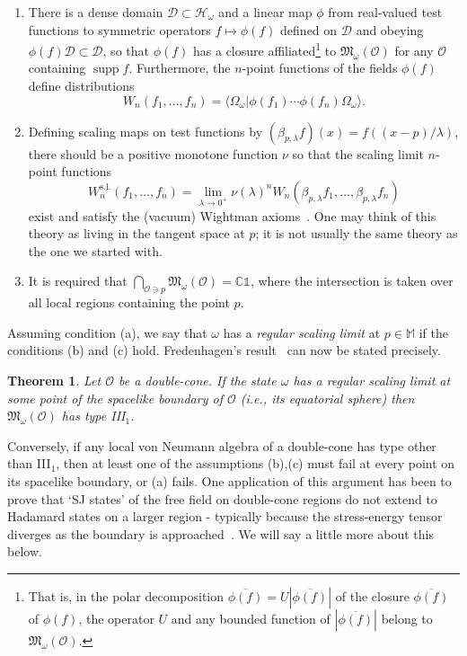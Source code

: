 \documentclass[12pt,a4paper]{article}
\newcommand{\1}{\mathds{1}}                         %
\newcommand{\CC}{\mathbb{C}}           %
\newcommand{\Ocal}{\mathcal{O}}
\newcommand{\MM}{\mathbb{M}}
\newcommand{\HH}{{\mathcal{H}}}
\newcommand{\DD}{{\mathscr{D}}}
\newcommand{\Mf}{{\mathfrak{M}}}
\newcommand{\II}{{\mathbb{1}}}
\newcommand{\ip}[2]{\langle #1|#2\rangle}
\newtheorem{theorem}{Theorem}%
\DeclareMathOperator{\supp}{supp}
\begin{document}
\begin{enumerate}[label=(\alph*)]
	\item There is a dense domain $\DD\subset \HH_\omega$ and a linear map $\phi$
	from real-valued test functions to symmetric operators $f\mapsto\phi(f)$ defined on $\DD$ and obeying $\phi(f)\DD\subset\DD$, so that $\phi(f)$ has a closure affiliated\footnote{That is, in the polar decomposition $\overline{\phi(f)}=U|\overline{\phi(f)}|$ of the closure $\overline{\phi(f)}$ of $\phi(f)$, the operator $U$ and any bounded function of $|\overline{\phi(f)}|$ belong to $\Mf_\omega(\Ocal)$.} 
	to $\Mf_\omega(\Ocal)$ for any $\Ocal$ containing $\supp f$. Furthermore, the $n$-point functions of the fields $\phi(f)$ define distributions
	\[
	W_n(f_1,\ldots,f_n)= \ip{\Omega_\omega}{\phi(f_1)\cdots\phi(f_n)\Omega_\omega}.
	\]
	\item Defining scaling maps on test functions by $(\beta_{p,\lambda}f)(x)=f((x-p)/\lambda)$, there should be a positive monotone function $\nu$ so that the scaling limit $n$-point functions
	\[
	W_n^{\text{s.l.}}(f_1,\ldots,f_n) = \lim_{\lambda\to 0^+} \nu(\lambda)^n W_n(\beta_{p,\lambda}f_1,\ldots,\beta_{p,\lambda} f_n)
	\] 
	exist and
	satisfy the (vacuum) Wightman axioms~\cite{StreaterWightman}. One may think of this theory as living in the tangent space at $p$; it is not usually the same theory as the one we started with.
	\item It is required that $\bigcap_{\Ocal\owns p}\Mf_\omega(\Ocal)=\CC\II$, where the intersection is taken over all local regions containing the point $p$.
\end{enumerate}
Assuming condition (a), we say that $\omega$ has a \emph{regular scaling limit} at $p\in\MM$ if the conditions (b) and (c) hold. Fredenhagen's result~\cite{Fredenhagen:1985} can now be stated precisely.
\begin{theorem}\label{thm:universaltype}
	Let $\Ocal$ be a double-cone. If the state $\omega$ has a regular scaling limit at some point of the spacelike boundary of $\Ocal$ (i.e., its equatorial sphere) then $\Mf_\omega(\Ocal)$ has type III${}_1$.   
\end{theorem} 
Conversely, if any local von Neumann algebra of a double-cone has type other than III${}_1$, then at least one of the assumptions (b),(c) must fail at every point on its spacelike boundary, or (a) fails. One application of this argument has been to prove that `SJ states' of the free field on double-cone regions do not extend to Hadamard states on a larger region - typically because the stress-energy tensor diverges as the boundary is approached~\cite{FewsterVerch:2013}. We will say a little more about this below.
\end{document}

